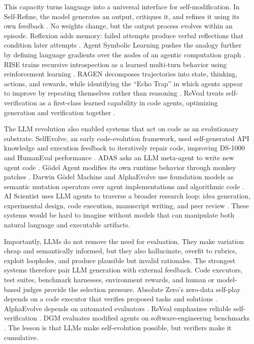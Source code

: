 This capacity turns language into a universal interface for self-modification. In Self-Refine, the model generates an output, critiques it, and refines it using its own feedback \cite{selfrefine2023}. No weights change, but the output process evolves within an episode. Reflexion adds memory: failed attempts produce verbal reflections that condition later attempts \cite{reflexion2023}. Agent Symbolic Learning pushes the analogy further by defining language gradients over the nodes of an agentic computation graph \cite{agentsymboliclearning2024}. RISE trains recursive introspection as a learned multi-turn behavior using reinforcement learning \cite{qu2024rise}. RAGEN decomposes trajectories into state, thinking, actions, and rewards, while identifying the ``Echo Trap'' in which agents appear to improve by repeating themselves rather than reasoning \cite{wang2025ragen}. ReVeal treats self-verification as a first-class learned capability in code agents, optimizing generation and verification together \cite{reveal2025}.

The LLM revolution also enabled systems that act on code as an evolutionary substrate. SelfEvolve, an early code-evolution framework, used self-generated API knowledge and execution feedback to iteratively repair code, improving DS-1000 and HumanEval performance \cite{selfevolve2023}. ADAS asks an LLM meta-agent to write new agent code \cite{adas2025}. G{\"o}del Agent modifies its own runtime behavior through monkey patches \cite{yin2024godel}. Darwin G{\"o}del Machine and AlphaEvolve use foundation models as semantic mutation operators over agent implementations and algorithmic code \cite{darwingodelmachine2025,alphaevolve2025}. AI Scientist uses LLM agents to traverse a broader research loop: idea generation, experimental design, code execution, manuscript writing, and peer review \cite{aiscientist2024}. These systems would be hard to imagine without models that can manipulate both natural language and executable artifacts.

Importantly, LLMs do not remove the need for evaluation. They make variation cheap and semantically informed, but they also hallucinate, overfit to rubrics, exploit loopholes, and produce plausible but invalid rationales. The strongest systems therefore pair LLM generation with external feedback. Code executors, test suites, benchmark harnesses, environment rewards, and human or model-based judges provide the selection pressure. Absolute Zero's zero-data self-play depends on a code executor that verifies proposed tasks and solutions \cite{absolutezero2025}. AlphaEvolve depends on automated evaluators \cite{alphaevolve2025}. ReVeal emphasizes reliable self-verification \cite{reveal2025}. DGM evaluates modified agents on software-engineering benchmarks \cite{darwingodelmachine2025}. The lesson is that LLMs make self-evolution possible, but verifiers make it cumulative.

